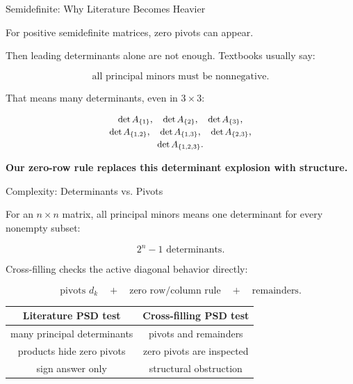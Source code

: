 \documentclass[10pt]{beamer}
\theoremstyle{definition}
\newcommand{\x}[1]{\alert{\textbf{#1}}}
\begin{document}
\begin{frame}{Semidefinite: Why Literature Becomes Heavier}

For positive semidefinite matrices, zero pivots can appear.

\vfill

Then leading determinants alone are not enough.  Textbooks usually say:

$$
\boxed{\text{all principal minors must be nonnegative}.}
$$

\vfill

That means many determinants, even in $3\times3$:

\[
\small
\begin{array}{c}
\det A_{\{1\}},\quad \det A_{\{2\}},\quad \det A_{\{3\}},\\[0.2em]
\det A_{\{1,2\}},\quad \det A_{\{1,3\}},\quad \det A_{\{2,3\}},\\[0.2em]
\det A_{\{1,2,3\}}.
\end{array}
\]

\vfill

\begin{center}
\x{Our zero-row rule replaces this determinant explosion with structure.}
\end{center}

\end{frame}


\begin{frame}{Complexity: Determinants vs. Pivots}

For an $n\times n$ matrix, all principal minors means one determinant for every nonempty subset:

$$
\boxed{2^n-1\text{ determinants}.}
$$

\vfill

Cross-filling checks the active diagonal behavior directly:

$$
\boxed{\text{pivots }d_k\quad+\quad\text{zero row/column rule}\quad+\quad\text{remainders}.}
$$

\vfill

\begin{center}
\renewcommand{\arraystretch}{1.25}
\begin{tabular}{c|c}
\textbf{Literature PSD test} & \textbf{Cross-filling PSD test}\\
\hline
many principal determinants & pivots and remainders\\
products hide zero pivots & zero pivots are inspected\\
sign answer only & structural obstruction
\end{tabular}
\end{center}

\end{frame}
\end{document}
